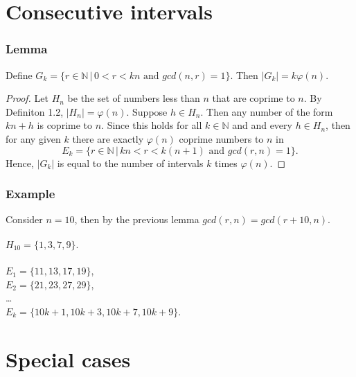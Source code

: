 \documentclass[envcountsect]{beamer}
\begin{document}
\section{Consecutive intervals}

\begin{frame}
\frametitle{Lemma}

\begin{lemma}
Define $G_k = \{ r \in \mathbb{N} \, | \, 0 < r < kn \text{ and } gcd(n,r) =
1\} $. Then $|G_k| = k\varphi(n).$
\end{lemma}

\begin{proof}
Let $H_n$ be the set of numbers less than $n$ that are coprime to $n$. By
Definiton 1.2, $|H_n| = \varphi(n)$. Suppose $h \in H_n$. Then any number of the
form $kn + h$ is coprime to $n$. Since this holds for all $k \in \mathbb{N}$ and
and every $h \in H_n$,
then for any given $k$ there are exactly $\varphi(n)$ coprime numbers to $n$ in
$$ E_k = \{ r \in \mathbb{N} \, | \, kn < r < k(n+1) \text{ and } gcd(r,n) = 1\}.$$
Hence, $|G_k|$ is equal to the number of intervals $k$ times $\varphi(n)$. 
\end{proof}

\end{frame}

\begin{frame}
\frametitle{Example}
\begin{example}
Consider $n = 10$, then by the previous lemma $gcd(r,n) =\allowbreak gcd(r+10,n)$. \\~\\
$H_{10} = \{1,3,7,9\}.$ \\~\\
$E_1 = \{11,13,17,19\}$,  \\
$E_2 = \{21,23,27,29\}$, \\
\dots\\
$E_k = \{10k + 1, 10k + 3, 10k + 7, 10k + 9\}$.

\end{example}
\end{frame}

\section{Special cases}
\end{document}
